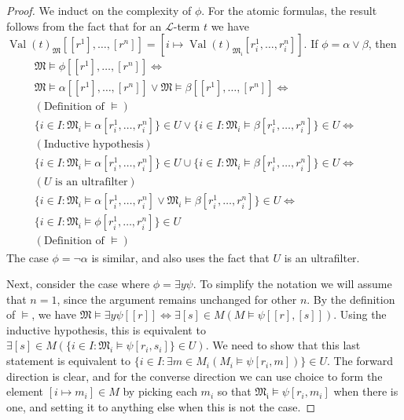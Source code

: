 \documentclass[leqno]{article}
\theoremstyle{remark}
\newcommand{\set}[1]{\{#1\}}
\newcommand{\lang}{\mathcal{L}}
\newcommand{\struct}[1]{\mathfrak{#1}}
\DeclareMathOperator{\Val}{Val}
\begin{document}
\begin{proof}
 We induct on the complexity of $\phi$. For the atomic formulas, the result follows from the fact that for an $\lang$-term $t$ we have $\Val(t)_\struct{M}[[r^1], \dots, [r^n]] = [i \mapsto \Val(t)_\struct{M_i}[r^1_i, \dots, r^n_i]]$. If $\phi = \alpha \lor \beta$, then \begin{align*}
     \struct{M} \models \phi[[r^1], \dots, [r^n]] \iff && \\ \struct{M} \models \alpha [[r^1], \dots, [r^n]] \lor \struct{M} \models \beta [[r^1], \dots, [r^n]] \iff && \\ (\text{Definition of $\models$}) \\ \set{i \in I : \struct{M}_i \models \alpha [r^1_i, \dots, r^n_i]} \in U \lor \set{i \in I : \struct{M}_i \models \beta [r^1_i, \dots, r^n_i]} \in U \iff \\ (\text{Inductive hypothesis}) \\ \set{i \in I : \struct{M}_i \models \alpha [r^1_i, \dots, r^n_i]} \in U \cup \set{i \in I : \struct{M}_i \models \beta [r^1_i, \dots, r^n_i]} \in U \iff \\ (\text{$U$ is an ultrafilter}) \\ \set{i \in I : \struct{M}_i \models \alpha [r^1_i, \dots, r^n_i] \lor \struct{M}_i \models \beta [r^1_i, \dots, r^n_i]} \in U  \iff \\ \set{i \in I : \struct{M}_i \models \phi [r^1_i, \dots, r^n_i]} \in U \\ (\text{Definition of $\models$})
 \end{align*} The case $\phi = \neg \alpha$ is similar, and also uses the fact that $U$ is an ultrafilter.
 
 Next, consider the case where $\phi = \exists y \psi$. To simplify the notation we will assume that $n = 1$, since the argument remains unchanged for other $n$. By the definition of $\models$, we have $\struct{M} \models \exists y \psi [[r]] \iff \exists [s] \in M (M \models \psi[[r], [s]])$. Using the inductive hypothesis, this is equivalent to $\exists [s] \in M (\set{i \in I : \struct{M}_i \models \psi[r_i, s_i]} \in U)$. We need to show that this last statement is equivalent to $\set{i \in I : \exists m \in M_i (M_i \models \psi[r_i, m])} \in U$. The forward direction is clear, and for the converse direction we can use choice to form the element $[i \mapsto m_i] \in M$ by picking each $m_i$ so that $\struct{M_i} \models \psi[r_i, m_i]$ when there is one, and setting it to anything else when this is not the case.
\end{proof}
\end{document}
